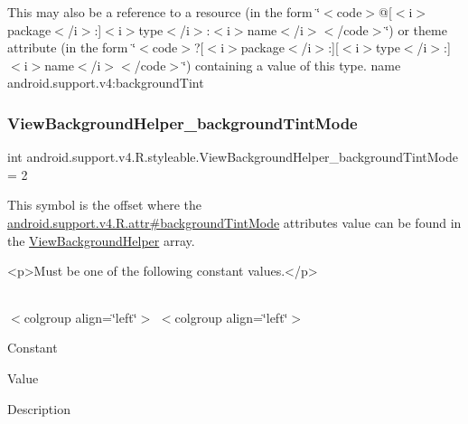 This may also be a reference to a resource (in the form \char`\"{}$<$code$>$@\mbox{[}$<$i$>$package$<$/i$>$\+:\mbox{]}$<$i$>$type$<$/i$>$\+:$<$i$>$name$<$/i$>$$<$/code$>$\char`\"{}) or theme attribute (in the form \char`\"{}$<$code$>$?\mbox{[}$<$i$>$package$<$/i$>$\+:\mbox{]}\mbox{[}$<$i$>$type$<$/i$>$\+:\mbox{]}$<$i$>$name$<$/i$>$$<$/code$>$\char`\"{}) containing a value of this type.  name android.\+support.\+v4\+:background\+Tint \mbox{\label{classandroid_1_1support_1_1v4_1_1R_1_1styleable_a3f0822323295c7efedb70efaaefe60dc}} 
\subsubsection{\texorpdfstring{View\+Background\+Helper\+\_\+background\+Tint\+Mode}{ViewBackgroundHelper\_backgroundTintMode}}
{\footnotesize\ttfamily int android.\+support.\+v4.\+R.\+styleable.\+View\+Background\+Helper\+\_\+background\+Tint\+Mode = 2\hspace{0.3cm}{\ttfamily [static]}}

This symbol is the offset where the \hyperlink{classandroid_1_1support_1_1v4_1_1R_1_1attr_a7169568146e422cf98009d4a36ee607c}{android.\+support.\+v4.\+R.\+attr\#background\+Tint\+Mode} attribute\textquotesingle{}s value can be found in the \hyperlink{classandroid_1_1support_1_1v4_1_1R_1_1styleable_aef8d9a5ffe04de4b6d0f50e89e307ca4}{View\+Background\+Helper} array.

\begin{DoxyVerb}      <p>Must be one of the following constant values.</p>
\end{DoxyVerb}
 \tabulinesep=1mm
\begin{longtabu} spread 0pt [c]{*{0}{|X[-1]}|}
\hline
\end{longtabu}
$<$colgroup align=\char`\"{}left\char`\"{}$>$ $<$colgroup align=\char`\"{}left\char`\"{}$>$ 

Constant

Value

Description 

